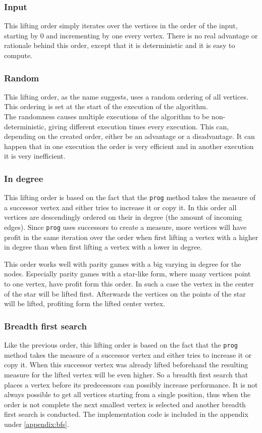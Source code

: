 \documentclass[10pt,a4paper]{article}
\begin{document}
\subsubsection{Input}
This lifting order simply iterates over the vertices in the order of the input, starting by 0 and incrementing by one every vertex. There is no real advantage or rationale behind this order, except that it is deterministic and it is easy to compute.

\subsubsection{Random}
This lifting order, as the name suggests, uses a random ordering of all vertices. This ordering is set at the start of the execution of the algorithm.\\
The randomness causes multiple executions of the algorithm to be non-deterministic, giving different execution times every execution. This can, depending on the created order, either be an advantage or a disadvantage. It can happen that in one execution the order is very efficient and in another execution it is very inefficient.

\subsubsection{In degree}\label{indegree}
This lifting order is based on the fact that the \verb|prog| method takes the measure of a successor vertex and either tries to increase it or copy it. In this order all vertices are descendingly ordered on their in degree (the amount of incoming edges). Since \verb|prog| uses successors to create a measure, more vertices will have profit in the same iteration over the order when first lifting a vertex with a higher in degree than when first lifting a vertex with a lower in degree.


This order works well with parity games with a big varying in degree for the nodes. Especially parity games with a star-like form, where many vertices point to one vertex, have profit form this order. In such a case the vertex in the center of the star will be lifted first. Afterwards the vertices on the points of the star will be lifted, profiting form the lifted center vertex.

\subsubsection{Breadth first search}
Like the previous order, this lifting order is based on the fact that the \verb|prog| method takes the measure of a successor vertex and either tries to increase it or copy it. When this successor vertex was already lifted beforehand the resulting measure for the lifted vertex will be even higher. So a breadth first search that places a vertex before its predecessors can possibly increase performance. It is not always possible to get all vertices starting from a single position, thus when the order is not complete the next smallest vertex is selected and another breadth first search is conducted. The implementation code is included in the appendix under \ref{appendix:bfs}.
\end{document}

